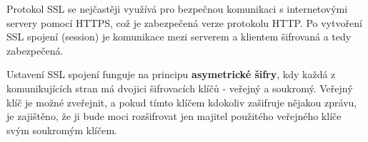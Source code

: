 Protokol SSL se nejčastěji využívá pro bezpečnou komunikaci s internetovými servery pomocí HTTPS, což je zabezpečená verze protokolu HTTP. Po vytvoření SSL spojení (session) je komunikace mezi serverem a klientem šifrovaná a tedy zabezpečená.

Ustavení SSL spojení funguje na principu \textbf{asymetrické šifry}, kdy každá z komunikujících stran má dvojici šifrovacích klíčů - veřejný a soukromý. Veřejný klíč je možné zveřejnit, a pokud tímto klíčem kdokoliv zašifruje nějakou zprávu, je zajištěno, že ji bude moci rozšifrovat jen majitel použitého veřejného klíče svým soukromým klíčem.

